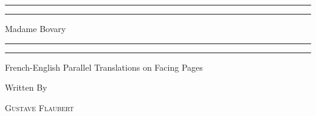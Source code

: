 \documentclass[a5paper]{book}
\begin{document}
\begin{titlepage} %

	\centering %
	
	\scshape %
	
	\vspace*{\baselineskip} %
	
	
	\rule{\textwidth}{1.6pt}\vspace*{-\baselineskip}\vspace*{2pt} %
	\rule{\textwidth}{0.4pt} %
	
	\vspace{0.75\baselineskip} %
	
	{\LARGE Madame Bovary\\} %
	
	\vspace{0.75\baselineskip} %
	
	\rule{\textwidth}{0.4pt}\vspace*{-\baselineskip}\vspace{3.2pt} %
	\rule{\textwidth}{1.6pt} %
	
	\vspace{2\baselineskip} %
	
	
	French-English Parallel Translations on Facing Pages %
	
	\vspace*{3\baselineskip} %
	
	
	Written By
	
	\vspace{0.5\baselineskip} %
	
	{\scshape\Large Gustave Flaubert \\} %
	

\end{titlepage}
\end{document}
